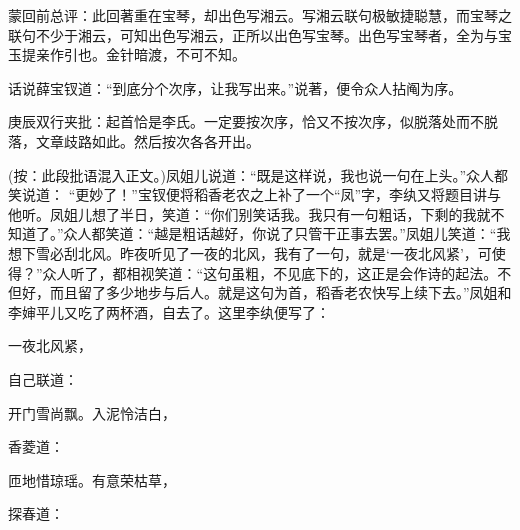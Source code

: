 \begin{parag}
    \begin{note}蒙回前总评：此回著重在宝琴，却出色写湘云。写湘云联句极敏捷聪慧，而宝琴之联句不少于湘云，可知出色写湘云，正所以出色写宝琴。出色写宝琴者，全为与宝玉提亲作引也。金针暗渡，不可不知。\end{note}
\end{parag}


\begin{parag}
    话说薛宝钗道：“到底分个次序，让我写出来。”说著，便令众人拈阄为序。\begin{note}庚辰双行夹批：起首恰是李氏。一定要按次序，恰又不按次序，似脱落处而不脱落，文章歧路如此。然后按次各各开出。\end{note}(按：此段批语混入正文。)凤姐儿说道：“既是这样说，我也说一句在上头。”众人都笑说道： “更妙了！”宝钗便将稻香老农之上补了一个“凤”字，李纨又将题目讲与他听。凤姐儿想了半日，笑道：“你们别笑话我。我只有一句粗话，下剩的我就不知道了。”众人都笑道：“越是粗话越好，你说了只管干正事去罢。”凤姐儿笑道：“我想下雪必刮北风。昨夜听见了一夜的北风，我有了一句，就是‘一夜北风紧’，可使得？”众人听了，都相视笑道：“这句虽粗，不见底下的，这正是会作诗的起法。不但好，而且留了多少地步与后人。就是这句为首，稻香老农快写上续下去。”凤姐和李婶平儿又吃了两杯酒，自去了。这里李纨便写了：
\end{parag}


\begin{poem}
    \begin{pl} 一夜北风紧，\end{pl}
\end{poem}


\begin{parag}
    自己联道：
\end{parag}


\begin{poem}
    \begin{pl} 开门雪尚飘。入泥怜洁白，\end{pl}
\end{poem}


\begin{parag}
    香菱道：
\end{parag}


\begin{poem}
    \begin{pl} 匝地惜琼瑶。有意荣枯草，\end{pl}
\end{poem}


\begin{parag}
    探春道：
\end{parag}


